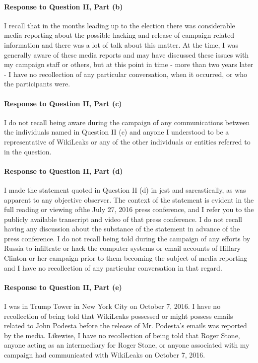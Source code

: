 \paragraph*{Response to Question II, Part (b)}

I recall that in the months leading up to the election there was considerable media reporting about the possible hacking and release of campaign-related information and there was a lot of talk about this matter.
At the time, I was generally aware of these media reports and may have discussed these issues with my campaign staff or others, but at this point in time - more than two years later - I have no recollection of any particular conversation, when it occurred, or who the participants were.

\paragraph*{Response to Question II, Part (c)}

I do not recall being aware during the campaign of any communications between the individuals named in Question II (c) and anyone I understood to be a representative of WikiLeaks or any of the other individuals or entities referred to in the question.

\paragraph*{Response to Question II, Part (d)}

I made the statement quoted in Question II (d) in jest and sarcastically, as was apparent to any objective observer.
The context of the statement is evident in the full reading or viewing ofthe July 27, 2016 press conference, and I refer you to the publicly available transcript and video of that press conference.
I do not recall having any discussion about the substance of the statement in advance of the press conference.
I do not recall being told during the campaign of any efforts by Russia to infiltrate or hack the computer systems or email accounts of Hillary Clinton or her campaign prior to them becoming the subject of media reporting and I have no recollection of any particular conversation in that regard.

\paragraph*{Response to Question II, Part (e)}

I was in Trump Tower in New York City on October 7, 2016.
I have no recollection of being told that WikiLeaks possessed or might possess emails related to John Podesta before the release of Mr. Podesta’s emails was reported by the media.
Likewise, I have no recollection of being told that Roger Stone, anyone acting as an intermediary for Roger Stone, or anyone associated with my campaign had communicated with WikiLeaks on October 7, 2016.

